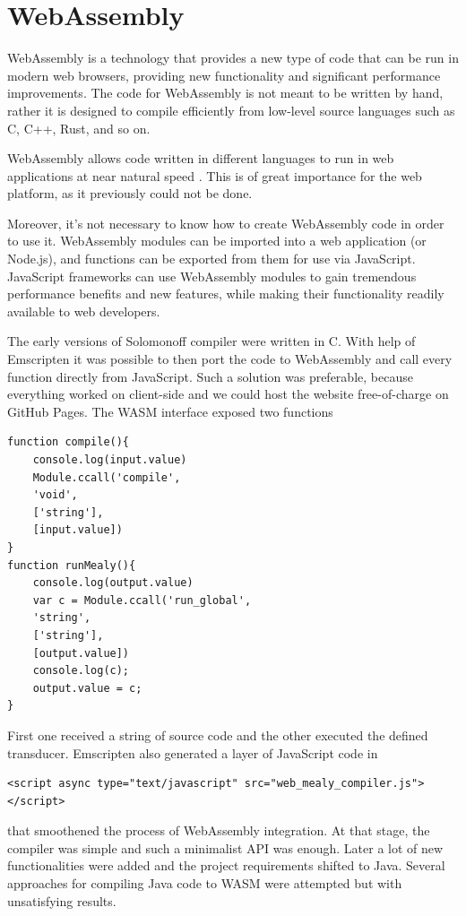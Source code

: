 \section{WebAssembly}

WebAssembly \cite{webassembly} is a technology 
that provides a new type of code 
that can be run in modern web browsers, 
providing new functionality and significant 
performance improvements. The code 
for WebAssembly is not meant to be 
written by hand, rather it is designed 
to compile efficiently from low-level 
source languages
such as C, C++, 
Rust, and so on.

WebAssembly allows code
written
in 
different languages
to run in web applications 
at near natural speed \cite{webassembly_speed,webassembly_speed2,webassembly_speed3}. 
This is of great importance 
for the web platform, as 
it previously could not be done.

Moreover, it's not necessary to know how to create WebAssembly code in order to use it. WebAssembly modules can be imported into a web application (or Node.js), and functions can be exported from them for use via JavaScript. JavaScript frameworks can use WebAssembly modules to gain tremendous performance benefits and new features, while making their functionality readily available to web developers.


The early versions of Solomonoff compiler were written in C. With help of Emscripten it was possible to then port the code to WebAssembly and call every function directly from JavaScript. Such a solution was preferable, because everything worked on client-side and we could host the website free-of-charge on GitHub
Pages. The WASM interface exposed two functions
\begin{lstlisting}
function compile(){
    console.log(input.value)
    Module.ccall('compile',
    'void',
    ['string'], 
    [input.value])
}
function runMealy(){
    console.log(output.value)
    var c = Module.ccall('run_global',
    'string',
    ['string'], 
    [output.value])
    console.log(c);
    output.value = c;
}
\end{lstlisting}
First one received a string of source code and the other executed the defined transducer. 
Emscripten also generated a layer of JavaScript code in
\begin{lstlisting}
<script async type="text/javascript" src="web_mealy_compiler.js"></script>
\end{lstlisting}
that smoothened the process of WebAssembly integration.
At that stage, the compiler was simple and such a minimalist API was enough. Later a lot of new functionalities were added and the project requirements shifted to Java. Several approaches for compiling Java code to WASM were attempted but with unsatisfying results.

